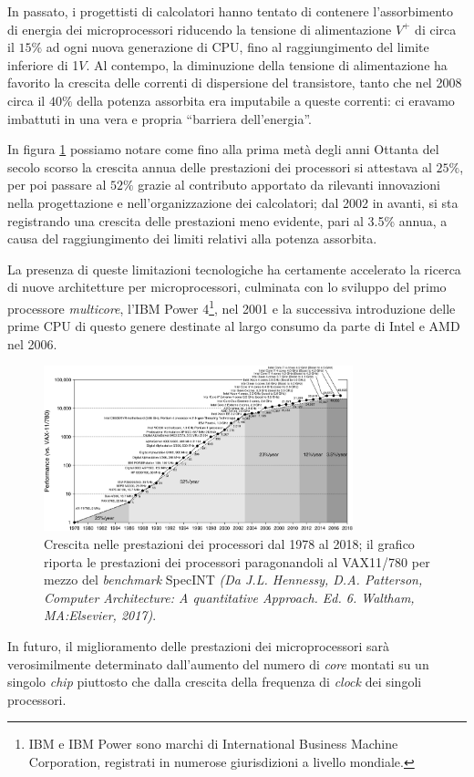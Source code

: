 In passato, i progettisti di calcolatori hanno tentato di contenere l'assorbimento di energia dei microprocessori riducendo la tensione di alimentazione $V^{+}$ di circa il $15\%$ ad ogni nuova generazione di CPU, fino al raggiungimento del limite inferiore di 1$\si{V}$.\newline
Al contempo, la diminuzione della tensione di alimentazione ha favorito la crescita delle correnti di dispersione del transistore, tanto che nel 2008 circa il $40\%$ della potenza assorbita era imputabile a queste correnti: ci eravamo imbattuti in una vera e propria \enquote{barriera dell'energia}.

In figura \ref{fig:PrestazioniProcessori} possiamo notare come fino alla prima met\`a degli anni Ottanta del secolo scorso la crescita annua delle prestazioni dei processori si attestava al $25\%$, per poi passare al $52\%$ grazie al contributo apportato da rilevanti innovazioni nella progettazione e nell'organizzazione dei calcolatori; dal 2002 in avanti, si sta registrando una crescita delle prestazioni meno evidente, pari al \num{3.5}\% annua, a causa del raggiungimento dei limiti relativi alla potenza assorbita.

La presenza di queste limitazioni tecnologiche ha certamente accelerato la ricerca di nuove architetture per microprocessori, culminata con lo sviluppo del primo processore \textit{multicore}, l'IBM Power\textsuperscript{\textregistered} 4\footnote{IBM e IBM Power sono marchi di International Business Machine Corporation, registrati in numerose giurisdizioni a livello mondiale.}, nel 2001 e la successiva introduzione delle prime CPU di questo genere destinate al largo consumo da parte di Intel e AMD nel 2006.
\begin{figure}[htbp]
    \centering
    \includegraphics[width=0.8\textwidth]{../Risorse/Capitolo 1/PrestazioniProcessori}

    \caption{Crescita nelle prestazioni dei processori dal 1978 al 2018; il grafico riporta le prestazioni dei processori paragonandoli al VAX11/780 per mezzo del \textit{benchmark} SpecINT \small{\textit{(Da J.L. Hennessy, D.A. Patterson, Computer Architecture: A quantitative Approach. Ed. 6. Waltham, MA:Elsevier, 2017)}}.}
    \label{fig:PrestazioniProcessori}
\end{figure}\newline
In futuro, il miglioramento delle prestazioni dei microprocessori sar\`a verosimilmente determinato dall'aumento del numero di \textit{core} montati su un singolo \textit{chip} piuttosto che dalla crescita della frequenza di \textit{clock} dei singoli processori.

